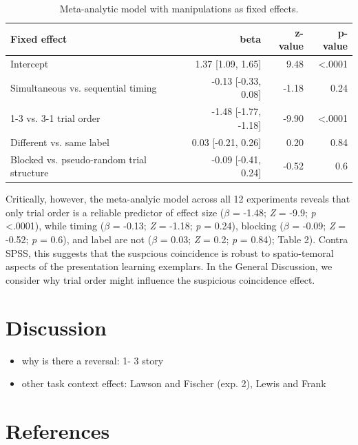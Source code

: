 \documentclass[english,floatsintext,man]{apa6}
\providecommand{\tightlist}{%
  \setlength{\itemsep}{0pt}\setlength{\parskip}{0pt}}
\theoremstyle{definition}
\theoremstyle{definition}
\theoremstyle{remark}
\begin{document}
\begin{table}

\caption{\label{tab:unnamed-chunk-5}Meta-analytic model with manipulations as fixed effects.}
\centering
\fontsize{12}{14}\selectfont
\begin{tabular}[t]{lrrr}
\toprule
Fixed effect & beta & z-value & p-value\\
\midrule
Intercept & 1.37 [1.09, 1.65] & 9.48 & <.0001\\
Simultaneous vs. sequential timing & -0.13 [-0.33, 0.08] & -1.18 & 0.24\\
1-3 vs. 3-1 trial order & -1.48 [-1.77, -1.18] & -9.90 & <.0001\\
Different vs. same label & 0.03 [-0.21, 0.26] & 0.20 & 0.84\\
Blocked vs. pseudo-random trial structure & -0.09 [-0.41, 0.24] & -0.52 & 0.6\\
\bottomrule
\end{tabular}
\end{table}

Critically, however, the meta-analyic model across all 12 experiments
reveals that only trial order is a reliable predictor of effect size
(\(\beta\) = -1.48; \emph{Z} = -9.9; \emph{p} \textless{}.0001), while
timing (\(\beta\) = -0.13; \emph{Z} = -1.18; \emph{p} = 0.24), blocking
(\(\beta\) = -0.09; \emph{Z} = -0.52; \emph{p} = 0.6), and label are not
(\(\beta\) = 0.03; \emph{Z} = 0.2; \emph{p} = 0.84); Table 2). Contra
SPSS, this suggests that the suspcious coincidence is robust to
spatio-temoral aspects of the presentation learning exemplars. In the
General Discussion, we consider why trial order might influence the
suspicious coincidence effect.

\section{Discussion}\label{discussion}

\begin{itemize}
\tightlist
\item
  why is there a reversal: 1- 3 story
\item
  other task context effect: Lawson and Fischer (exp. 2), Lewis and
  Frank
\end{itemize}

\newpage

\section{References}\label{references}
\end{document}
